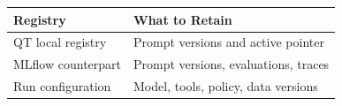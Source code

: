 \begin{tabular}{@{}P{4.0cm}P{8.5cm}@{}}
\toprule
\textbf{Registry} & \textbf{What to Retain} \\
\midrule
QT local registry & Prompt versions and active pointer \\
MLflow counterpart & Prompt versions, evaluations, traces \\
Run configuration & Model, tools, policy, data versions \\
\bottomrule
\end{tabular}

